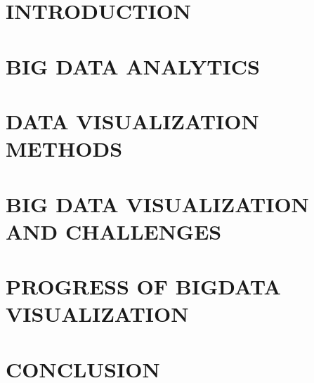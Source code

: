 \documentclass[12pt]{report}
\title{}
\author{}
\begin{document}
	

\begin{abstract}
	            Big Data analytics plays a key role through reducing the data size and complexity in Big Data applications. Visualization is an important approach to helping Big Data get a complete view of data and discover data values. Big Data analytics and visualization should be integrated seamlessly so that they work best in Big Data applications. Conventional data visualization methods as well as the extension of some conventional methods to Big Data applications are introduced in this paper. This report presents the recent methods used in Bigdata visualization ,it's applications , technological progress and challenges involved.
\end{abstract}

\tableofcontents
\listoffigures

\chapter{INTRODUCTION}


\chapter{BIG DATA ANALYTICS}


\chapter{DATA VISUALIZATION METHODS}


\chapter{BIG DATA VISUALIZATION AND CHALLENGES}


\chapter{PROGRESS OF BIGDATA VISUALIZATION}


\chapter{CONCLUSION}



\end{document}
